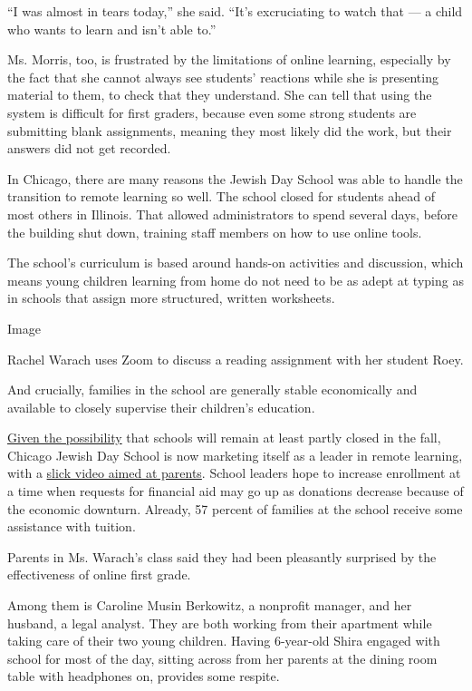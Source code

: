 ``I was almost in tears today,'' she said. ``It's excruciating to watch
that --- a child who wants to learn and isn't able to.''

Ms. Morris, too, is frustrated by the limitations of online learning,
especially by the fact that she cannot always see students' reactions
while she is presenting material to them, to check that they understand.
She can tell that using the system is difficult for first graders,
because even some strong students are submitting blank assignments,
meaning they most likely did the work, but their answers did not get
recorded.

In Chicago, there are many reasons the Jewish Day School was able to
handle the transition to remote learning so well. The school closed for
students ahead of most others in Illinois. That allowed administrators
to spend several days, before the building shut down, training staff
members on how to use online tools.

The school's curriculum is based around hands-on activities and
discussion, which means young children learning from home do not need to
be as adept at typing as in schools that assign more structured, written
worksheets.

Image

Rachel Warach uses Zoom to discuss a reading assignment with her student
Roey.

And crucially, families in the school are generally stable economically
and available to closely supervise their children's education.

\href{https://www.nytimes.com/2020/04/28/us/coronavirus-schools-reopen.html}{Given
the possibility} that schools will remain at least partly closed in the
fall, Chicago Jewish Day School is now marketing itself as a leader in
remote learning, with a
\href{https://vimeo.com/409618723?fbclid=IwAR3GArK9URuzo5b3YMRZtVaP6hRp0eektfrxCQV-_INSp0g8oQpStZHn7YU}{slick
video aimed at parents}. School leaders hope to increase enrollment at a
time when requests for financial aid may go up as donations decrease
because of the economic downturn. Already, 57 percent of families at the
school receive some assistance with tuition.

Parents in Ms. Warach's class said they had been pleasantly surprised by
the effectiveness of online first grade.

Among them is Caroline Musin Berkowitz, a nonprofit manager, and her
husband, a legal analyst. They are both working from their apartment
while taking care of their two young children. Having 6-year-old Shira
engaged with school for most of the day, sitting across from her parents
at the dining room table with headphones on, provides some respite.


